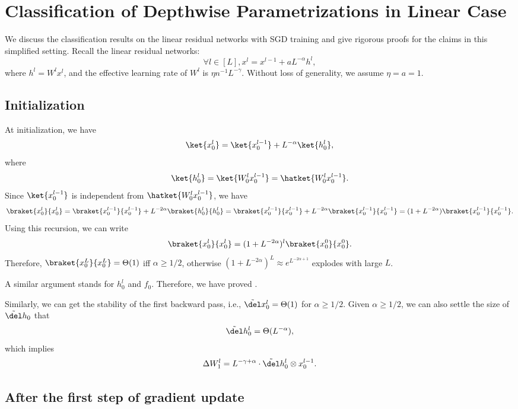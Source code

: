 \section{Classification of Depthwise Parametrizations in Linear Case}\label{sec:linearsgd_classification}

We discuss the classification results on the linear residual networks with SGD training and give rigorous proofs for the claims in this simplified setting. Recall the linear residual networks:
\[
\forall l \in [L], x^l = x^{l-1} + a L^{-\alpha} h^l, 
\]
where $h^l=W^l x^l$, and the effective learning rate of $W^l$ is $\eta n^{-1} L^{-\gamma}$. Without loss of generality, we assume $\eta=a=1$. 

\subsection{Initialization}
At initialization, we have 
\[
\ket{x_0^l} = \ket{x_0^{l-1}} + L^{-\alpha} \ket{h^l_0},
\]
where \[\ket{h_0^l}=\ket{W_0^l x_0^{l-1}}=\hatket{W_0^l x_0^{l-1}}.\]
Since $\ket{x_0^{l-1}}$ is independent from $\hatket{W_0^l x_0^{l-1}}$,
we have 
\[\braket{x_0^l}{x_0^l} = \braket{x_0^{l-1}}{x_0^{l-1}} + L^{-2\alpha} \braket{h^l_0}{h^l_0} = \braket{x_0^{l-1}}{x_0^{l-1}} + L^{-2\alpha} \braket{x_0^{l-1}}{x_0^{l-1}} =  (1+L^{-2\alpha})\braket{x_0^{l-1}}{x_0^{l-1}}.\]
Using this recursion, we can write 
\[\braket{x_0^l}{x_0^l} = (1+L^{-2\alpha})^l \braket{x_0^0}{x_0^0}.\]
Therefore, $\braket{x_0^L}{x_0^L}=\Theta(1)$ iff $\alpha\geq 1/2$, otherwise $(1+L^{-2\alpha})^L\approx e^{L^{-2\alpha+1}}$ explodes with large $L$.

A similar argument stands for $h^l_0$ and $f_0$. Therefore, we have proved .

Similarly, we can get the stability of the first backward pass, i.e., $\tilde \del x_0^l=\Theta(1)$ for $\alpha\geq 1/2$. Given $\alpha \geq 1/2$, we can also settle the size of $\tilde \del h_0$ that
\[\tilde \del h_0^l = \Theta(L^{-\alpha}), \]
which implies 
\[\Delta W_1^l = L^{-\gamma+\alpha}\cdot \tilde \del  h_0^l \otimes x_0^{l-1}.\]

\subsection{After the first step of gradient update}

